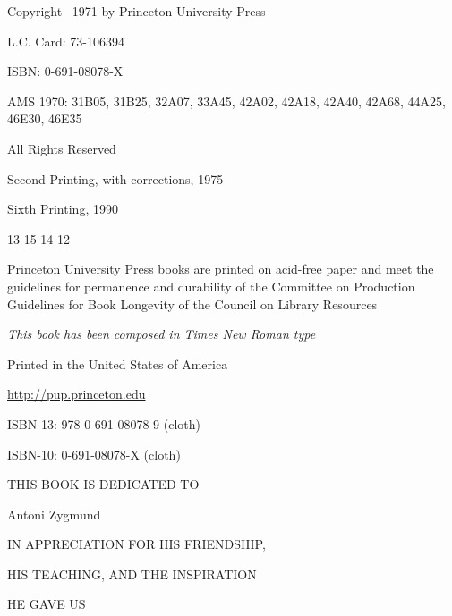 \thispagestyle{empty}
\vspace*{3cm}
\begin{center}
Copyright \textcopyright\ 1971 by Princeton University Press

L.C. Card: 73-106394

ISBN: 0-691-08078-X

AMS 1970: 31B05, 31B25, 32A07, 33A45, 42A02, 42A18, 42A40, 42A68, 44A25, 46E30, 46E35

All Rights Reserved

Second Printing, with corrections, 1975

Sixth Printing, 1990
\end{center}
\vspace{2ex}
\begin{center}
13 15 14 12
\end{center}
\vspace{2ex}
\begin{center}
\small Princeton University Press books are printed on acid-free paper and
meet the guidelines for permanence and durability of the Committee on
Production Guidelines for Book Longevity of the Council on Library Resources
\end{center}
\vspace{2ex}
\begin{center}
\itshape This book has been composed in Times New Roman type

Printed in the United States of America

\url{http://pup.princeton.edu}

ISBN-13: 978-0-691-08078-9 (cloth)

ISBN-10: 0-691-08078-X (cloth)
\end{center}
\cleardoublepage

\thispagestyle{empty}
\vspace*{\fill}
\begin{center}
THIS BOOK IS DEDICATED TO

\vspace{2ex}
\large Antoni Zygmund

\vspace{3ex}
IN APPRECIATION FOR HIS FRIENDSHIP,

HIS TEACHING, AND THE INSPIRATION

HE GAVE US
\end{center}
\vspace*{\fill}
\cleardoublepage

